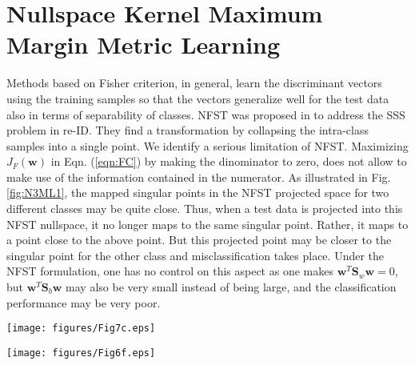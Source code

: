 \documentclass[runningheads]{llncs}
\begin{document}
\section{Nullspace Kernel Maximum Margin Metric Learning}
\label{sec:NK3ML}
Methods based on Fisher criterion, in general, learn the discriminant vectors using the training samples so that the vectors generalize well for the test data also in terms of separability of classes. NFST\cite{guo:nfst,bodesheim:novelty} was proposed in \cite{Zheng:nfst} to address the SSS problem in re-ID. They find a transformation by collapsing the intra-class samples into a single point. We identify a serious limitation of NFST. Maximizing $J_F(\mathbf{w})$ in Eqn. (\ref{eqn:FC}) by making the dinominator to zero, does not allow to make use of the information contained in the numerator. As illustrated in Fig. \ref{fig:N3ML1},  the mapped singular points in the NFST projected space for two different classes may be quite close. Thus, when a test data is projected into this NFST nullspace, it no longer maps to the same singular point. Rather, it maps to a point close to the above point. But this projected point may be closer to the singular point for the other class and misclassification takes place. Under the NFST formulation, one has no control on this aspect as one makes $\mathbf{w}^T\mathbf{S}_w \mathbf{w} = 0$, but $\mathbf{w}^T\mathbf{S}_b \mathbf{w}$ may also be very small instead of being large, and the classification performance may be very poor. 

\begin{figure*}[t!]
\begin{center}
   \texttt{[image: figures/Fig7c.eps]}
\end{center}
   \caption{Illustration of the suboptimality in NFST. Each color corresponds to distinct classes.}
\label{fig:N3ML1}
\end{figure*}

\begin{figure*}[t]
\begin{center}
   \texttt{[image: figures/Fig6f.eps]}
\end{center}
   \caption{Illustration of our method NK3ML. Each color corresponds to distinct classes.}
\label{fig:N3ML2}
\end{figure*}
\end{document}
